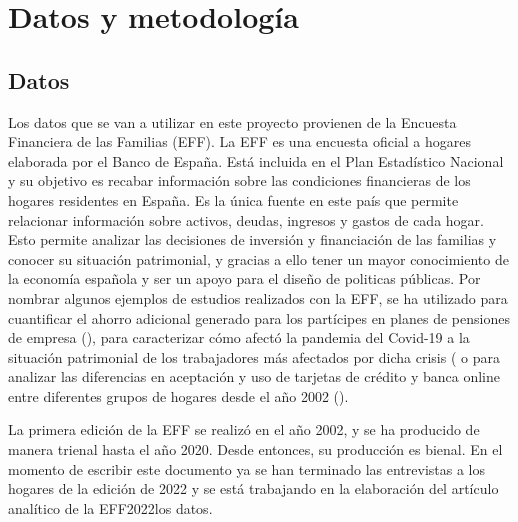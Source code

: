 \chapter{Datos y metodología}
\label{chapter:datos_metodologia}
\section{Datos}

Los datos que se van a utilizar en este proyecto provienen de la Encuesta Financiera de las Familias (EFF). La EFF es una encuesta oficial a hogares elaborada por el Banco de España. Está incluida en el Plan Estadístico Nacional y su objetivo es recabar información sobre las condiciones financieras de los hogares residentes en España. Es la única fuente en este país que permite relacionar información sobre activos, deudas, ingresos y gastos de cada hogar. Esto permite analizar las decisiones de inversión y financiación de las familias y conocer su situación patrimonial, y gracias a ello tener un mayor conocimiento de la economía española y ser un apoyo para el diseño de politicas públicas. Por nombrar algunos ejemplos de estudios realizados con la EFF, se ha utilizado para cuantificar el ahorro adicional generado para los partícipes en planes de pensiones de empresa (\cite{gomez2022pensiones}), para caracterizar cómo afectó la pandemia del Covid-19 a la situación patrimonial de los trabajadores más afectados por dicha crisis (\cite{alvargonzalez2020pandemia} o para analizar las diferencias en aceptación y uso de tarjetas de crédito y banca online entre diferentes grupos de hogares desde el año 2002 (\cite{crespo2023bancaonline}).

La primera edición de la EFF se realizó en el año 2002, y se ha producido de manera trienal hasta el año 2020. Desde entonces, su producción es bienal. En el momento de escribir este documento ya se han terminado las entrevistas a los hogares de la edición de 2022 y se está trabajando en la elaboración del artículo analítico de la EFF2022los datos.

